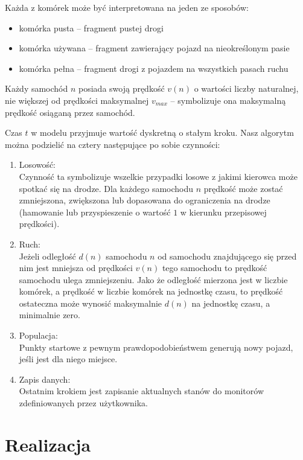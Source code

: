 \documentclass[a4paper,12pt]{article}
\begin{document}
    Każda z komórek może być interpretowana na jeden ze sposobów:
    
    \begin{itemize}
    	\item komórka pusta -- fragment pustej drogi
    	\item komórka używana -- fragment zawierający pojazd na nieokreślonym pasie
    	\item komórka pełna -- fragment drogi z pojazdem na wszystkich pasach ruchu
    \end{itemize}

	Każdy samochód $n$ posiada swoją prędkość $v(n)$ o wartości liczby naturalnej, nie większej od prędkości maksymalnej $v_{max}$ -- symbolizuje ona maksymalną prędkość osiąganą przez samochód.
	
	Czas $t$ w modelu przyjmuje wartość dyskretną o stałym kroku. Nasz algorytm można podzielić na cztery następujące po sobie czynności:

	\begin{enumerate}
		\item Losowość: \\
		Czynność ta symbolizuje wszelkie przypadki losowe z jakimi kierowca może spotkać się na drodze.
		Dla każdego samochodu $n$ prędkość może zostać zmniejszona, zwiększona lub dopasowana do ograniczenia na drodze (hamowanie lub przyspieszenie o wartość $1$ w kierunku przepisowej prędkości).
		
		\item Ruch: \\
		Jeżeli odległość $d(n)$ samochodu $n$ od samochodu znajdującego się przed nim jest mniejsza od prędkości $v(n)$ tego samochodu to prędkość samochodu ulega zmniejszeniu. Jako że odległość mierzona jest w liczbie komórek, a prędkość w liczbie komórek na jednostkę czasu, to prędkość ostateczna może wynosić maksymalnie $d(n)$ na jednostkę czasu, a minimalnie zero.
		
		\item Populacja: \\
		Punkty startowe z pewnym prawdopodobieństwem generują nowy pojazd, jeśli jest dla niego miejsce.
		
		\item Zapis danych: \\
		Ostatnim krokiem jest zapisanie aktualnych stanów do monitorów zdefiniowanych przez użytkownika.
	\end{enumerate}

    \part{Realizacja}
    
\end{document}
